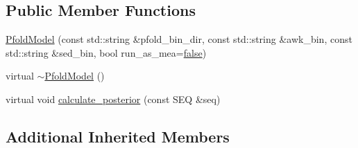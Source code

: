 \subsection*{Public Member Functions}
\begin{DoxyCompactItemize}
\item 
\hyperlink{class_pfold_model_aaa99dc56b808fe0fbdb2ac21810f9c02}{Pfold\+Model} (const std\+::string \&pfold\+\_\+bin\+\_\+dir, const std\+::string \&awk\+\_\+bin, const std\+::string \&sed\+\_\+bin, bool run\+\_\+as\+\_\+mea=\hyperlink{naview_8c_a65e9886d74aaee76545e83dd09011727}{false})
\item 
virtual \hyperlink{class_pfold_model_a3aa6fa770f1f1f665807cf4504438f08}{$\sim$\+Pfold\+Model} ()
\item 
virtual void \hyperlink{class_pfold_model_a049dd223a8aae36e6e3b9d1c6e9c3b6f}{calculate\+\_\+posterior} (const S\+E\+Q \&seq)
\end{DoxyCompactItemize}
\subsection*{Additional Inherited Members}


